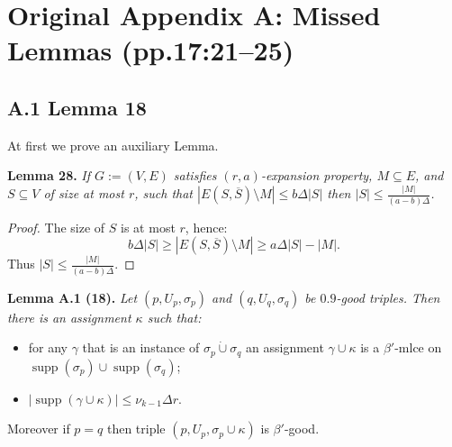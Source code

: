 \documentclass[10pt,a4paper]{article}
\newcommand{\supp}{\operatorname{supp}}
\newcommand{\joint}{\mathbin{\dot\cup}}
\newenvironment{result}[1]{\par\medskip\noindent\textbf{#1.}\itshape}{\par\medskip}
\begin{document}
\section*{Original Appendix A: Missed Lemmas (pp.17:21--25)}
\subsection*{A.1 Lemma 18}
At first we prove an auxiliary Lemma.
\begin{result}{Lemma 28}
If $G:=(V,E)$ satisfies $(r,a)$-expansion property, $M\subseteq E$, and $S\subseteq V$ of size at most $r$, such that $|E(S,\overline S)\setminus M|\le b\Delta|S|$ then $|S|\le\frac{|M|}{(a-b)\Delta}$.
\end{result}
\begin{proof}
The size of $S$ is at most $r$, hence:
\[b\Delta|S|\ge|E(S,\overline S)\setminus M|\ge a\Delta|S|-|M|.\]
Thus $|S|\le\frac{|M|}{(a-b)\Delta}$.
\end{proof}
\begin{result}{Lemma A.1 (18)}
Let $(p,U_p,\sigma_p)$ and $(q,U_q,\sigma_q)$ be $0.9$-good triples. Then there is an assignment $\kappa$ such that:
\begin{itemize}\item for any $\gamma$ that is an instance of $\sigma_p\joint\sigma_q$ an assignment $\gamma\cup\kappa$ is a $\beta'$-mlce on $\supp(\sigma_p)\cup\supp(\sigma_q)$;
\item $|\supp(\gamma\cup\kappa)|\le\nu_{k-1}\Delta r$.\end{itemize}
Moreover if $p=q$ then triple $(p,U_p,\sigma_p\cup\kappa)$ is $\beta'$-good.
\end{result}
\end{document}
